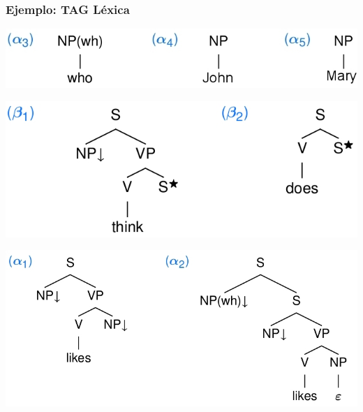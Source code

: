 \documentclass[compress,color=usenames]{beamer}
\begin{document}
\begin{frame}
\frametitle{Ejemplo: TAG L\'exica}

\begin{center}
\includegraphics[scale=.35]{pics/pic2-30.jpg} \pause
\medskip

\includegraphics[scale=.35]{pics/pic2-29.jpg} \pause
\medskip

\includegraphics[scale=.35]{pics/pic2-28.jpg}

\end{center}
\end{frame}
\end{document}
